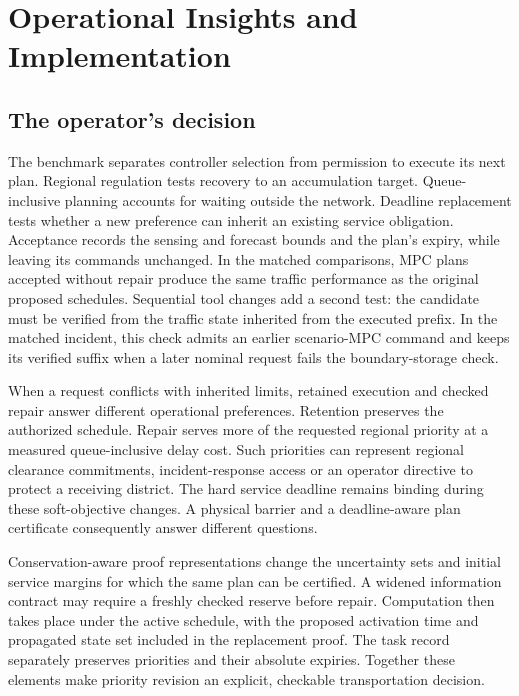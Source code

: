 \documentclass[preprint,12pt]{elsarticle}
\begin{document}
\section{Operational Insights and Implementation}
\label{sec:new-discussion}

\subsection{The operator's decision}

The benchmark separates controller selection from permission to execute its
next plan. Regional regulation tests recovery to an accumulation target.
Queue-inclusive planning accounts for waiting outside the network. Deadline
replacement tests whether a new preference can inherit an existing service
obligation. Acceptance records the sensing and forecast bounds and the plan's expiry,
while leaving its commands unchanged. In the matched comparisons, MPC plans accepted without repair produce
the same traffic performance as the original proposed schedules.
Sequential tool changes add a second test: the candidate must be verified
from the traffic state inherited from the executed prefix. In the matched
incident, this check admits an earlier scenario-MPC command and keeps its
verified suffix when a later nominal request fails the boundary-storage check.

When a request conflicts with inherited limits, retained execution and
checked repair answer different operational preferences. Retention preserves
the authorized schedule. Repair serves more of the requested regional
priority at a measured queue-inclusive delay cost. Such priorities can
represent regional clearance commitments, incident-response access or an
operator directive to protect a receiving district. The hard service deadline
remains binding during these soft-objective changes. A physical barrier and
a deadline-aware plan certificate consequently answer different questions.

Conservation-aware proof representations change the uncertainty sets and
initial service margins for which the same plan can be certified. A widened
information contract may require a freshly checked reserve before repair.
Computation then takes place under the active schedule, with the proposed
activation time and propagated state set included in the replacement proof.
The task record separately preserves priorities and their absolute expiries.
Together these elements make priority revision an explicit, checkable
transportation decision.
\end{document}
